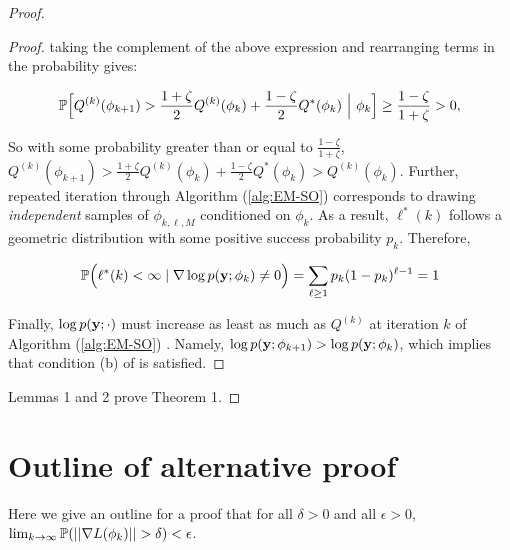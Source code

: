 \begin{proof}
\begin{proof}
taking the complement of the above expression and rearranging terms in the probability gives:

\begin{equation}
    \mathbb{P} \Big[Q^{(k)}(\phi_{k+1}) > \frac{1 + \zeta}{2} Q^{(k)}(\phi_{k}) + \frac{1 - \zeta}{2} Q^*(\phi_{k}) ~\Big\vert~ \phi_{k} \Big] \geq \frac{1-\zeta}{1 + \zeta} > 0 \label{eqn:markov_ineq},
\end{equation}

So with some probability greater than or equal to $\frac{1-\zeta}{1+\zeta}$, $Q^{(k)}(\phi_{k+1}) > \frac{1 + \zeta}{2} Q^{(k)}(\phi_{k}) + \frac{1 - \zeta}{2} Q^*(\phi_{k}) > Q^{(k)}(\phi_k)$. Further, repeated iteration through Algorithm (\ref{alg:EM-SO}) corresponds to drawing \textit{independent} samples of $\phi_{k,\ell,M}$ conditioned on $\phi_k$. As a result, $\ell^*(k)$ follows a geometric distribution with some positive success probability $p_k$. Therefore, 

$$\mathbb{P}\Big(\ell^*(k) < \infty \mid \nabla \log p(\mathbf{y};\phi_k) \neq 0 \Big) = \sum_{\ell \geq 1} p_k(1-p_k)^{\ell-1} = 1$$

Finally, $\log p(\mathbf{y} ; \cdot)$ must increase as least as much as $Q^{(k)}$ at iteration $k$ of Algorithm (\ref{alg:EM-SO}) \citep{Dempster:1977}. Namely, $\log p(\mathbf{y} ; \phi_{k+1}) > \log p(\mathbf{y} ; \phi_k)$, which implies that condition (b) of \citet{Wu:1983} is satisfied.
\end{proof}

Lemmas 1 and 2 prove Theorem 1.

\end{proof}

\section{Outline of alternative proof}

Here we give an outline for a proof that for all $\delta > 0$ and all $\epsilon > 0$, $\lim_{k \to \infty} \mathbb{P}(||\nabla L (\phi_k) || > \delta) < \epsilon$.

